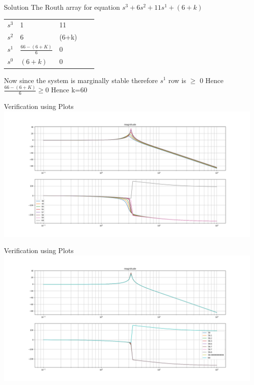 \documentclass{beamer}
\begin{document}
\begin{frame}{Solution}
The Routh array for equation $s^3+6s^2+11s^1+(6+k)$
\begin{table}[]
\begin{tabular}{lllll}
$s^3$ & 1            & 11    &  &  \\
$s^2$ & 6            & (6+k) &  &  \\
$s^1$ & $\frac{66-(6+K)}{6}$& 0     &  &  \\
$s^0$ & $(6+k)$        & 0     &  & 


\end{tabular}
\end{table}
Now since the system is marginally stable therefore $s^1$ row is $\geq$ 0\newline
Hence $\frac{66-(6+K)}{6}$$\geq$0
Hence k=60
\end{frame}
\begin{frame}{Verification using Plots}
\includegraphics[scale=0.27]{bode2.png}

\end{frame}
\begin{frame}{Verification using Plots}
\includegraphics[scale=0.27]{bode.png}

\end{frame}
\end{document}
